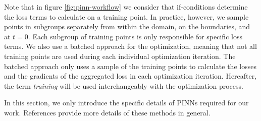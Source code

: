 Note that in figure \ref{fig:pinn-workflow} we consider that if-conditions determine the loss terms to calculate on a training point.
In practice, however, we sample points in subgroups separately from within the domain, on the boundaries, and at $t=0$.
Each subgroup of training points is only responsible for specific loss terms.
We also use a batched approach for the optimization,
meaning that not all training points are used during each individual optimization iteration.
The batched approach only uses a sample of the training points to calculate the losses and the gradients of the aggregated loss in each optimization iteration.
Hereafter, the term {\it training} will be used interchangeably with the optimization process.

In this section, we only introduce the specific details of PINNs required for our work.
References \cite{dissanayake_neural-network-based_1994,lagaris_artificial_1998,cai_physics-informed_2021} provide more details of these methods in general.

